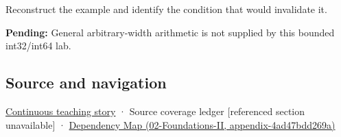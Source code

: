 Reconstruct the example and identify the condition that would invalidate it.

\textbf{Pending:} General arbitrary-width arithmetic is not supplied by this bounded int32/int64 lab.

\subsection{Source and navigation}\label{appendix-3333db47830f-source-and-navigation}

\hyperref[01-foundations-i-ch001-choosing-what-information-to-keep]{Continuous teaching story} · {Source coverage ledger {[}referenced section unavailable{]}} · \href{../02-Foundations-II/main.pdf\#nameddest=appendix-4ad47bdd269a}{Dependency Map (02-Foundations-II, appendix-4ad47bdd269a)}

